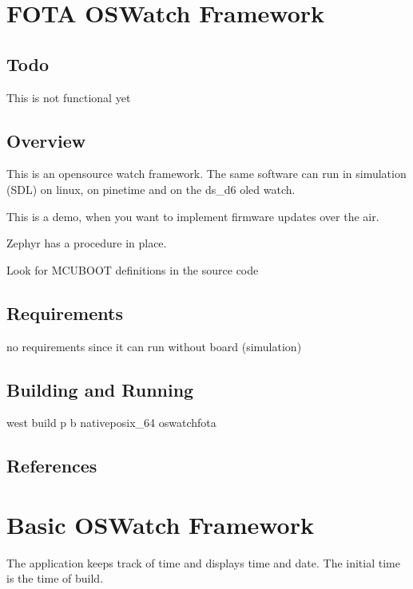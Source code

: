 \documentclass[letterpaper,10pt,english]{sphinxmanual}
\begin{document}
\section{FOTA OSWatch Framework}
\label{\detokenize{samples/oswatch-fotaREADME:fota-oswatch-framework}}\label{\detokenize{samples/oswatch-fotaREADME:oswatch}}\label{\detokenize{samples/oswatch-fotaREADME::doc}}

\subsection{Todo}
\label{\detokenize{samples/oswatch-fotaREADME:todo}}
This is not functional yet


\subsection{Overview}
\label{\detokenize{samples/oswatch-fotaREADME:overview}}
This is an opensource watch framework.
The same software can run in simulation (SDL) on linux, on pinetime and on the ds\_d6 oled watch.

This is a demo, when you want to implement firmware updates over the air.

Zephyr has a procedure in place.

Look for MCUBOOT definitions in the source code


\subsection{Requirements}
\label{\detokenize{samples/oswatch-fotaREADME:requirements}}
no requirements since it can run without board (simulation)


\subsection{Building and Running}
\label{\detokenize{samples/oswatch-fotaREADME:building-and-running}}
west build \sphinxhyphen{}p \sphinxhyphen{}b  native\sphinxhyphen{}posix\_64 oswatch\sphinxhyphen{}fota


\subsection{References}
\label{\detokenize{samples/oswatch-fotaREADME:references}}

\section{Basic OSWatch Framework}
\label{\detokenize{samples/oswatchREADME:basic-oswatch-framework}}\label{\detokenize{samples/oswatchREADME:oswatch}}\label{\detokenize{samples/oswatchREADME::doc}}
The application keeps track of time and displays time and date.
The initial time is the time of build.
\end{document}

